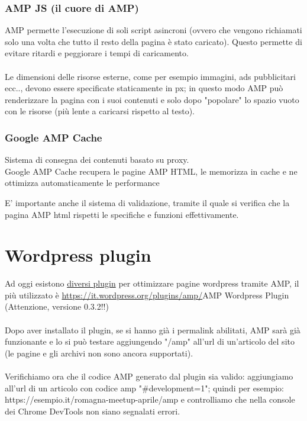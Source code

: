 \documentclass{article}
\begin{document}
    \subsubsection{AMP JS (il cuore di AMP)}
    AMP permette l'esecuzione di soli script asincroni (ovvero che vengono richiamati solo una volta che tutto il resto della pagina è stato caricato). Questo permette di evitare ritardi e peggiorare i tempi di caricamento.\\
    \\
    Le dimensioni delle risorse esterne, come per esempio immagini, ads pubblicitari ecc.., devono essere specificate staticamente in px; in questo modo AMP può renderizzare la pagina con i suoi contenuti e solo dopo "popolare" lo spazio vuoto con le risorse (più lente a caricarsi rispetto al testo).\\
    
    \subsubsection{Google AMP Cache}
    Sistema di consegna dei contenuti basato su proxy.\\
    Google AMP Cache recupera le pagine AMP HTML, le memorizza in cache e ne ottimizza automaticamente le performance
    
    E' importante anche il sistema di validazione, tramite il quale si verifica che la pagina AMP html rispetti le specifiche e funzioni effettivamente.

\section{Wordpress plugin}
Ad oggi esistono \href{https://it.wordpress.org/plugins/search.php?q=amp}{diversi plugin} per ottimizzare pagine wordpress tramite AMP, il più utilizzato è \url{https://it.wordpress.org/plugins/amp/}{AMP Wordpress Plugin} (Attenzione, versione 0.3.2!!)\\
\\
Dopo aver installato il plugin, se si hanno già i permalink abilitati, AMP sarà già funzionante e lo si può testare aggiungendo "/amp" all'url di un'articolo del sito (le pagine e gli archivi non sono ancora supportati).\\
\\
Verifichiamo ora che il codice AMP generato dal plugin sia valido: aggiungiamo all'url di un articolo con codice amp "\#development=1"; quindi per esempio: https://esempio.it/romagna-meetup-aprile/amp e controlliamo che nella console dei Chrome DevTools non siano segnalati errori.
\end{document}
